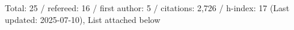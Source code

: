 Total: 25 / refereed: 16 / first author: 5 / citations: 2,726 / h-index: 17 (Last updated: 2025-07-10), List attached below